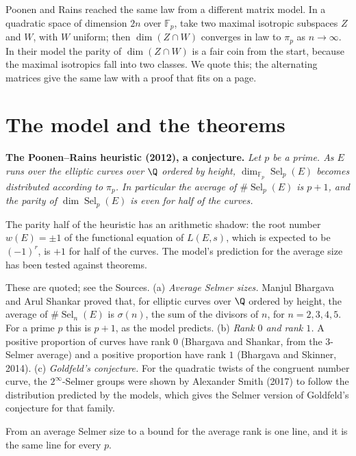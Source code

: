 Poonen and Rains reached the same law from a different matrix model. In a quadratic space of dimension $2n$ over $\mathbb F_p$, take two maximal isotropic subspaces $Z$ and $W$, with $W$ uniform; then $\dim(Z\cap W)$ converges in law to $\pi_p$ as $n\to\infty$. In their model the parity of $\dim(Z\cap W)$ is a fair coin from the start, because the maximal isotropics fall into two classes. We quote this; the alternating matrices give the same law with a proof that fits on a page.

\section{The model and the theorems}

\medskip\noindent\textbf{The Poonen--Rains heuristic (2012), a conjecture.} \emph{Let $p$ be a prime. As $E$ runs over the elliptic curves over $\Q$ ordered by height, $\dim_{\mathbb F_p}\operatorname{Sel}_p(E)$ becomes distributed according to $\pi_p$. In particular the average of $\#\operatorname{Sel}_p(E)$ is $p+1$, and the parity of $\dim\operatorname{Sel}_p(E)$ is even for half of the curves.}

\medskip
The parity half of the heuristic has an arithmetic shadow: the root number $w(E)=\pm1$ of the functional equation of $L(E,s)$, which is expected to be $(-1)^r$, is $+1$ for half of the curves. The model's prediction for the average size has been tested against theorems.

\begin{remark}
These are quoted; see the Sources. (a) \emph{Average Selmer sizes.} Manjul Bhargava and Arul Shankar proved that, for elliptic curves over $\Q$ ordered by height, the average of $\#\operatorname{Sel}_n(E)$ is $\sigma(n)$, the sum of the divisors of $n$, for $n=2,3,4,5$. For a prime $p$ this is $p+1$, as the model predicts. (b) \emph{Rank $0$ and rank $1$.} A positive proportion of curves have rank $0$ (Bhargava and Shankar, from the $3$-Selmer average) and a positive proportion have rank $1$ (Bhargava and Skinner, 2014). (c) \emph{Goldfeld's conjecture.} For the quadratic twists of the congruent number curve, the $2^\infty$-Selmer groups were shown by Alexander Smith (2017) to follow the distribution predicted by the models, which gives the Selmer version of Goldfeld's conjecture for that family.
\end{remark}

From an average Selmer size to a bound for the average rank is one line, and it is the same line for every $p$.


